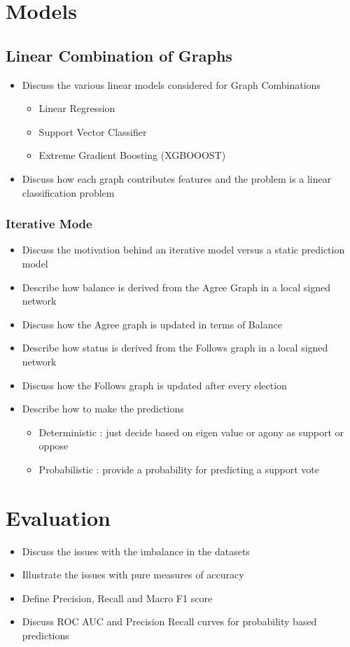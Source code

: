 \section{Models}
\subsection{Linear Combination of Graphs}
\begin{itemize}
    \item Discuss the various linear models considered for Graph Combinations
    \begin{itemize}
        \item Linear Regression
        \item Support Vector Classifier
        \item Extreme Gradient Boosting (XGBOOOST) 
    \end{itemize}
    \item Discuss how each graph contributes features and the problem is a linear classification problem
\end{itemize}
\subsubsection{Iterative Mode}
\begin{itemize}
    \item Discuss the motivation behind an iterative model versus a static prediction model
    \item Describe how balance is derived from the Agree Graph in a local signed network
    \item Discuss how the Agree graph is updated in terms of Balance
    \item Describe how status is derived from the Follows graph in a local signed network 
    \item Discuss how the Follows graph is updated after every election
    \item Describe how to make the predictions 
    \begin{itemize}
        \item Deterministic : just decide based on eigen value or agony as support or oppose
        \item Probabilistic : provide a probability for predicting a support vote
    \end{itemize}
\end{itemize}
\section{Evaluation}
\begin{itemize}
    \item Discuss the issues with the imbalance in the datasets
    \item Illustrate the issues with pure measures of accuracy
    \item Define Precision, Recall and Macro F1 score
    \item Discuss ROC AUC and Precision Recall curves for probability based predictions 
\end{itemize}

